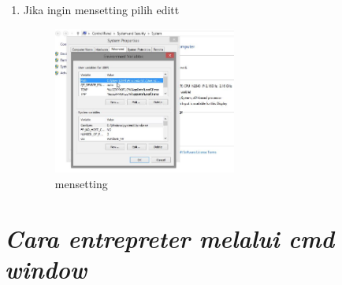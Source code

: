 \begin{enumerate}
\item Jika ingin mensetting pilih editt
\begin{figure}[h]
\includegraphics[width=6cm]{figure/setting4.png}
\centering
\caption{mensetting}
\end{figure}
\end{enumerate}
\section*{\textit{ Cara entrepreter melalui cmd window }}
